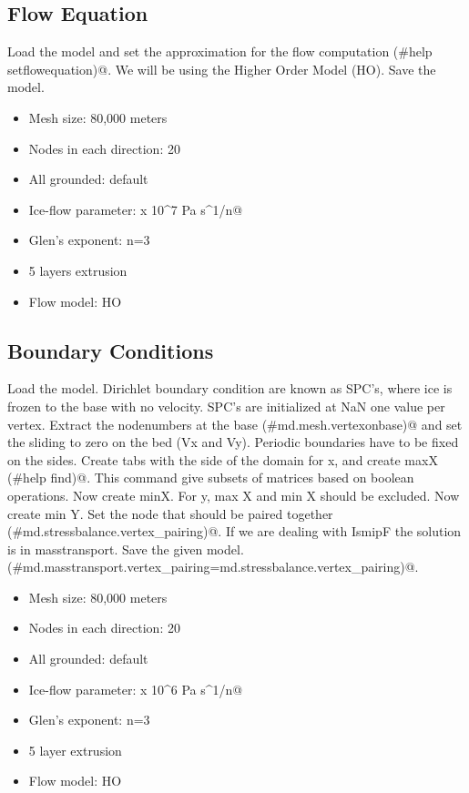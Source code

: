 \subsection{Flow Equation} %
Load the \verb@Extrusion@ model and set the approximation for the flow computation \verb@(#help setflowequation)@. We will be using the Higher Order Model (HO). Save the model.
\begin{itemize}
	\item Mesh size: 80,000 meters
	\item Nodes in each direction: 20
	\item All grounded: default
	\item Ice-flow parameter:  x 10^7 Pa s^1/n@
	\item Glen's exponent: n=3
	\item 5 layers extrusion
	\item Flow model: HO
\end{itemize}
\subsection{Boundary Conditions} %
Load the \verb@SetFlow@ model. Dirichlet boundary condition are known as SPC's, where ice is frozen to the base with no velocity. SPC's are initialized at NaN one value per vertex. Extract the nodenumbers at the base \verb@(#md.mesh.vertexonbase)@ and set the sliding to zero on the bed (Vx and Vy). Periodic boundaries have to be fixed on the sides. Create tabs with the side of the domain for x, and create maxX \verb@(#help find)@. This command give subsets of matrices based on boolean operations. Now create minX. For y, max X and min X should be excluded. Now create min Y. Set the node that should be paired together \verb@(#md.stressbalance.vertex_pairing)@. If we are dealing with IsmipF the solution is in masstransport. Save the given model. \verb@(#md.masstransport.vertex_pairing=md.stressbalance.vertex_pairing)@.
\begin{itemize}
	\item Mesh size: 80,000 meters
	\item Nodes in each direction: 20
	\item All grounded: default
	\item Ice-flow parameter:  x 10^6 Pa s^1/n@
	\item Glen's exponent: n=3
	\item 5 layer extrusion
	\item Flow model: HO
\end{itemize}
